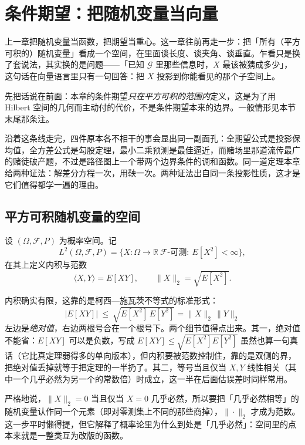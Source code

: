 
\section{条件期望：把随机变量当向量}

上一章把随机变量当函数，把期望当重心。这一章往前再走一步：把「所有（平方可积的）随机变量」看成一个空间，在里面谈长度、谈夹角、谈垂直。乍看只是换了套说法，其实换的是问题——「已知 $\mathcal{G}$ 里那些信息时，$X$ 最该被猜成多少」，这句话在向量语言里只有一句回答：把 $X$ 投影到你能看见的那个子空间上。

先把话说在前面：本章的条件期望\emph{只在平方可积的范围内}定义，这是为了用 Hilbert 空间的几何而主动付的代价，不是条件期望本来的边界。一般情形见本节末尾那条注。

沿着这条线走完，四件原本各不相干的事会显出同一副面孔：全期望公式是投影保均值，全方差公式是勾股定理，最小二乘预测是最佳逼近，而赌场里那道流传最广的赌徒破产题，不过是路径图上一个带两个边界条件的调和函数。同一道定理本章给两种证法：解差分方程一次，用鞅一次。两种证法出自同一条投影性质，这才是它们值得都学一遍的理由。

\subsection{平方可积随机变量的空间}

\begin{definition}[$L^2$ 空间]
设 $(\Omega,\mathcal{F},P)$ 为概率空间。记
\[
L^2(\Omega,\mathcal{F},P)=\Big\{X:\Omega\to\mathbb{R}\ \text{$\mathcal{F}$-可测}:\ E[X^2]<\infty\Big\},
\]
在其上定义内积与范数
\[
\langle X,Y\rangle=E[XY],\qquad \|X\|_2=\sqrt{E[X^2]} .
\]
\end{definition}

内积确实有限，这靠的是柯西—施瓦茨不等式的标准形式：
\[
\boxed{\ \big|E[XY]\big|\ \le\ \sqrt{E[X^2]\,E[Y^2]}=\|X\|_2\,\|Y\|_2\ }
\]
左边是\emph{绝对值}，右边两根号合在一个根号下。两个细节值得点出来。其一，绝对值不能省：$E[XY]$ 可以是负数，写成 $E[XY]\le\sqrt{E[X^2]E[Y^2]}$ 虽然也算一句真话（它比真定理弱得多的单向版本），但内积要被范数控制住，靠的是双侧的界，把绝对值丢掉就等于把定理的一半扔了。其二，等号当且仅当 $X,Y$ 线性相关（其中一个几乎必然为另一个的常数倍）时成立，这一半在后面估误差时同样常用。

严格地说，$\|X\|_2=0$ 当且仅当 $X=0$ 几乎必然，所以要把「几乎必然相等」的随机变量认作同一个元素（即对零测集上不同的那些商掉），$\|\cdot\|_2$ 才成为范数。这一步平时懒得提，但它解释了概率论里为什么到处是「几乎必然」：空间里的点本来就是一整类互为改版的函数。

